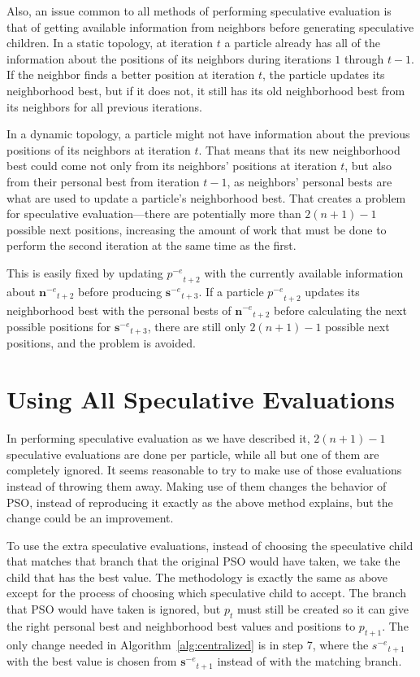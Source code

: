 \documentclass[letterpaper]{sig-alt-release2}
\newcommand{\alg}[1]{Algorithm~\ref{alg:#1}}
\providecommand{\noeval}[1]{\ensuremath{#1^{-e}}}
\providecommand{\p}{\ensuremath{p}}
\providecommand{\s}{\ensuremath{s}}
\providecommand{\sset}{\ensuremath{\mathbf{s}}}
\providecommand{\nset}{\ensuremath{\mathbf{n}}}
\begin{document}
Also, an issue common to all methods of performing speculative evaluation is
that of getting available information from neighbors before generating
speculative children.  In a static topology, at iteration $t$ a particle
already has all of the information about the positions of its neighbors during
iterations $1$ through $t-1$.  If the neighbor finds a better position at 
iteration $t$, the particle updates its neighborhood best, but if it does not,
it still has its old neighborhood best from its neighbors for all previous 
iterations.

In a dynamic topology, a particle might not have information about the previous
positions of its neighbors at iteration $t$.  That means that its new
neighborhood best could come not only from its neighbors' positions at
iteration $t$, but also from their personal best from iteration $t-1$, as
neighbors' personal bests are what are used to update a particle's neighborhood
best.  That creates a problem for speculative evaluation---there are
potentially more than $2(n+1)-1$ possible next positions, increasing the amount
of work that must be done to perform the second iteration at the same time as
the first.

This is easily fixed by updating $\noeval{\p}_{t+2}$ with the currently
available information about $\noeval{\nset}_{t+2}$ before producing
$\noeval{\sset}_{t+3}$.  If a particle $\noeval{\p}_{t+2}$ updates its 
neighborhood best with the personal bests of $\noeval{\nset}_{t+2}$ before
calculating the next possible positions for $\noeval{\sset}_{t+3}$, there are
still only $2(n+1)-1$ possible next positions, and the problem is avoided.

\section{Using All Speculative Evaluations}
\label{sec:extra}

In performing speculative evaluation as we have described it, $2(n+1)-1$
speculative evaluations are done per particle, while all but one of them are
completely ignored.  It seems reasonable to try to make use of those
evaluations instead of throwing them away.  Making use of them changes the
behavior of PSO, instead of reproducing it exactly as the above method
explains, but the change could be an improvement.

To use the extra speculative evaluations, instead of choosing the speculative
child that matches that branch that the original PSO would have taken, we take
the child that has the best value.  The methodology is exactly the same as
above except for the process of choosing which speculative child to accept.
The branch that PSO would have taken is ignored, but $\p_t$ must still be
created so it can give the right personal best and neighborhood best values and
positions to $\p_{t+1}$.  The only change needed in \alg{centralized} is in
step 7, where the $\noeval{\s}_{t+1}$ with the best value is chosen from
$\noeval{\sset}_{t+1}$ instead of with the matching branch.
\end{document}
